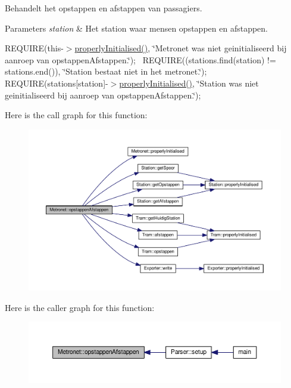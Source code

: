 Behandelt het opstappen en afstappen van passagiers. 


\begin{DoxyParams}{Parameters}
{\em station} & Het station waar mensen opstappen en afstappen.\\
\hline
\end{DoxyParams}
R\+E\+Q\+U\+I\+RE(this-\/$>$\hyperlink{class_metronet_a3d2adce29a947f162924279b766de645}{properly\+Initialised()}, \char`\"{}\+Metronet was niet geinitialiseerd bij aanroep van opstappen\+Afstappen.\char`\"{});~\newline
R\+E\+Q\+U\+I\+RE((stations.\+find(station) != stations.\+end()), \char`\"{}\+Station bestaat niet in het metronet.\char`\"{});~\newline
R\+E\+Q\+U\+I\+RE(stations\mbox{[}station\mbox{]}-\/$>$\hyperlink{class_metronet_a3d2adce29a947f162924279b766de645}{properly\+Initialised()}, \char`\"{}\+Station was niet geinitialiseerd bij aanroep van opstappen\+Afstappen.\char`\"{});~\newline


Here is the call graph for this function\+:
\nopagebreak
\begin{figure}[H]
\begin{center}
\leavevmode
\includegraphics[width=350pt]{class_metronet_a8d8fab798697599c77e22a5497d52b6d_cgraph}
\end{center}
\end{figure}




Here is the caller graph for this function\+:
\nopagebreak
\begin{figure}[H]
\begin{center}
\leavevmode
\includegraphics[width=350pt]{class_metronet_a8d8fab798697599c77e22a5497d52b6d_icgraph}
\end{center}
\end{figure}


